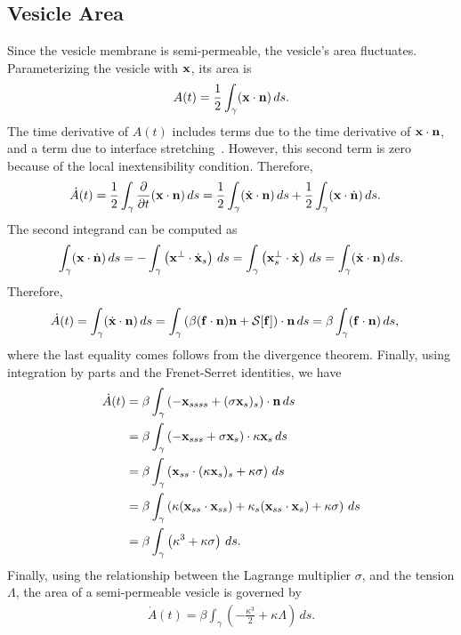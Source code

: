 \documentclass[aps,prl,showpacs]{revtex4}
\begin{document}
\subsection{Vesicle Area}
Since the vesicle membrane is semi-permeable, the vesicle's area
fluctuates.  Parameterizing the vesicle with $\mathbf{x}$, its area is
\begin{align}
  A(t) = \frac{1}{2}\int_{\gamma} (\mathbf{x} \cdot \mathbf{n})\, ds .
\end{align}
The time derivative of $A(t)$ includes terms due to the time derivative
of $\mathbf{x} \cdot \mathbf{n}$, and a term due to interface
stretching~\cite{lai-tse-hua2008}. However, this second term is zero
because of the local inextensibility condition. Therefore, 
\begin{align}
  \dot{A}(t) &= \frac{1}{2} \int_{\gamma} \frac{\partial }{\partial t} 
    (\mathbf{x} \cdot \mathbf{n}) \, ds = 
  \frac{1}{2} \int_{\gamma} (\dot{\mathbf{x}} \cdot \mathbf{n})\, ds  + 
  \frac{1}{2} \int_{\gamma} (\mathbf{x} \cdot \dot{\mathbf{n}})\, ds.
\end{align}
The second integrand can be computed as
\begin{align}
  \int_\gamma (\mathbf{x} \cdot \dot{\mathbf{n}})\, ds 
    = -\int_\gamma \left(\mathbf{x}^\perp \cdot \dot{\mathbf{x}}_s\right)\, ds 
    = \int_\gamma \left(\mathbf{x}_s^\perp \cdot \dot{\mathbf{x}}\right)\, ds 
    = \int_\gamma (\dot{\mathbf{x}} \cdot \mathbf{n})\, ds.
\end{align}
Therefore,
\begin{align}
  \dot{A}(t) &= \int_\gamma (\dot{\mathbf{x}} \cdot \mathbf{n})\, ds 
  = \int_\gamma \left(\beta (\mathbf{f} \cdot \mathbf{n})\mathbf{n} + \mathcal{S}[\mathbf{f}]\right) 
      \cdot \mathbf{n}\, ds 
  = \beta \int_\gamma (\mathbf{f} \cdot \mathbf{n})\, ds,
\end{align}
where the last equality comes follows from the divergence theorem.
Finally, using integration by parts and the Frenet-Serret identities, we
have
\begin{align}
  \dot{A}(t) &= \beta \int_\gamma \left( -\mathbf{x}_{ssss} + 
    (\sigma \mathbf{x}_s)_s \right) \cdot \mathbf{n} \, ds \\
  &= \beta \int_\gamma \left(-\mathbf{x}_{sss} + \sigma \mathbf{x}_s 
    \right) \cdot \kappa \mathbf{x}_s \, ds \\
  &= \beta \int_\gamma \left(\mathbf{x}_{ss} \cdot 
    (\kappa \mathbf{x}_s)_s + \kappa \sigma \right) \, ds \\
  &= \beta \int_\gamma \left(\kappa (\mathbf{x}_{ss} \cdot \mathbf{x}_{ss}) + 
    \kappa_s (\mathbf{x}_{ss} \cdot \mathbf{x}_s) + \kappa \sigma \right) 
    \, ds \\
  &= \beta \int_\gamma \left(\kappa^3 + \kappa \sigma \right) 
    \, ds.
\end{align}
Finally, using the relationship between the Lagrange multiplier
$\sigma$, and the tension $\Lambda$, the area of a semi-permeable
vesicle is governed by
\begin{align}
  \dot{A}(t) = \beta \int_\gamma \left(
    -\frac{\kappa^3}{2} + \kappa \Lambda \right) \, ds.
  \label{eqn:areaROC}
\end{align}
\end{document}
